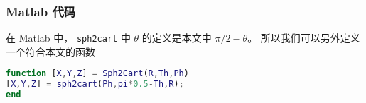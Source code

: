 \subsubsection{Matlab 代码}
在 Matlab 中， \verb`sph2cart` 中 $\theta$ 的定义是本文中 $\pi/2 - \theta$。 所以我们可以另外定义一个符合本文的函数
\begin{lstlisting}[language=matlab, caption=Sph2Cart.m]
% physics version of sph2cart
function [X,Y,Z] = Sph2Cart(R,Th,Ph)
[X,Y,Z] = sph2cart(Ph,pi*0.5-Th,R);
end
\end{lstlisting}
